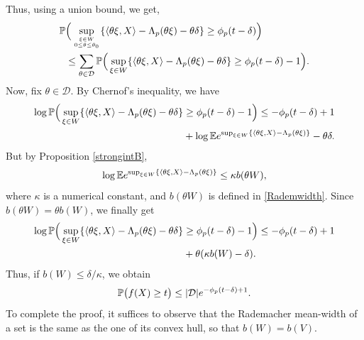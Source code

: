 \documentclass[a4paper,oneside,11pt]{article}
\begin{document}
Thus, using a union bound, we get,
\begin{align*}
 \mathbb{P}& \Big( \sup_{ \xi \in  W \atop 0 \leq \theta \leq \theta_0} \{ \langle \theta \xi, X\rangle - \Lambda_p(\theta\xi) - \theta \delta\} \geq \phi_p(t-\delta)\Big)   \\
&\leq \sum_{\theta \in \mathcal{D}} \mathbb{P}\Big( \sup_{ \xi \in  W}  \{ \langle \theta \xi , X\rangle - \Lambda_p(\theta\xi) - \theta \delta\} \geq \phi_p(t-\delta)-1\Big).\end{align*}
Now, fix $\theta \in \mathcal{D}$. By Chernof's inequality, we have
\begin{align*}
\log \mathbb{P}\Big( \sup_{ \xi \in  W}  \{ \langle \theta \xi , X\rangle - \Lambda_p(\theta\xi) - \theta \delta\}& \geq \phi_p(t-\delta)-1\Big) \leq  - \phi_p(t-\delta) +1 \\
&+ \log \mathbb{E}  e^{\sup_{ \xi \in  W}  \{ \langle \theta \xi , X\rangle - \Lambda_p(\theta\xi) \}}- \theta \delta.
\end{align*}
But by Proposition \ref{strongintB}, 
$$\log \mathbb{E}  e^{\sup_{ \xi \in  W}  \{ \langle \theta \xi , X\rangle - \Lambda_p(\theta\xi) \}} \leq \kappa b(\theta W),$$
where $\kappa$ is a numerical constant,  and $b(\theta W)$ is defined in \eqref{Rademwidth}. Since $b(\theta W) = \theta b(W)$, we finally get
\begin{align*}
\log \mathbb{P}\Big( \sup_{ \xi \in  W}  \{ \langle \theta \xi , X\rangle - \Lambda_p(\theta\xi) - \theta \delta\}& \geq \phi_p(t-\delta)-1\Big) \leq  - \phi_p(t-\delta) +1 \\
&+ \theta ( \kappa b(W)-  \delta).
\end{align*}
Thus, if $b(W) \leq \delta/\kappa$, we obtain
$$ \mathbb{P} \big( f(X) \geq t \big) \leq |\mathcal{D}| e^{-\phi_p(t-\delta) +1}.$$
To complete the proof, it suffices to observe that the Rademacher mean-width of a set is the same as the one of its convex hull, so that $b(W) = b(V)$.
\end{document}

